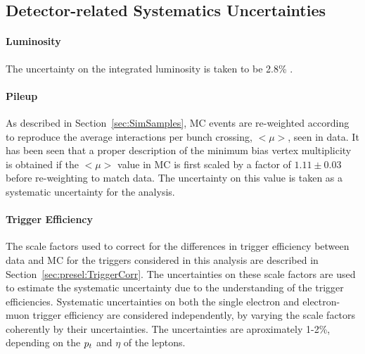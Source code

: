 \subsection{Detector-related Systematics Uncertainties}
\label{sec:sys:sys_det}

%
%



\paragraph{Luminosity}
The uncertainty on the integrated luminosity is taken to be 2.8\% \cite{luminosity}.

\paragraph{Pileup}
As described in Section~\ref{sec:SimSamples}, MC events are re-weighted according to reproduce the average interactions per bunch crossing, $<\mu>$, seen in data. It has been seen
that a proper description of the minimum bias vertex multiplicity is obtained if the $<\mu>$ 
value in MC is first scaled by a factor of $1.11 \pm 0.03$ before re-weighting to match data. The uncertainty
on this value is taken as a systematic uncertainty for the analysis.

\paragraph{Trigger Efficiency}
The scale factors used to correct for the differences in trigger efficiency between data and MC for the triggers considered in this analysis are described in Section~\ref{sec:presel:TriggerCorr}. The uncertainties on these scale factors are used to estimate the systematic uncertainty due to the understanding of the trigger efficiencies. 
Systematic uncertainties on both the single electron and
electron-muon trigger efficiency are considered independently, by varying the scale factors coherently by their uncertainties.
The uncertainties are aproximately 1-2\%, depending on the $p_{t}$ and $\eta$ of the leptons.

